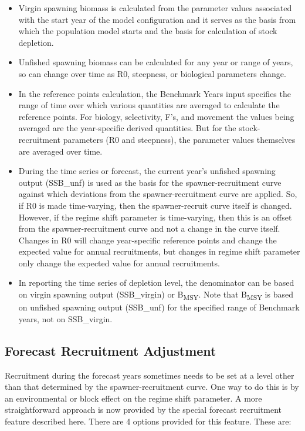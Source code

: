 \begin{itemize}
	\item Virgin spawning biomass is calculated from the parameter values associated with the start year of the model configuration and it serves as the basis from which the population model starts and the basis for calculation of stock depletion.
	
	\item Unfished spawning biomass can be calculated for any year or range of years, so can change over time as R0, steepness, or biological parameters change.
	
	\item In the reference points calculation, the Benchmark Years input specifies the range of time over which various quantities are averaged to calculate the reference points. For biology, selectivity, F's, and movement the values being averaged are the year-specific derived quantities. But for the stock-recruitment parameters (R0 and steepness), the parameter values themselves are averaged over time.
	
	\item During the time series or forecast, the current year's unfished spawning output (SSB\_unf) is used as the basis for the spawner-recruitment curve against which deviations from the spawner-recruitment curve are applied. So, if R0 is made time-varying, then the spawner-recruit curve itself is changed. However, if the regime shift parameter is time-varying, then this is an offset from the spawner-recruitment curve and not a change in the curve itself. Changes in R0 will change year-specific reference points and change the expected value for annual recruitments, but changes in regime shift parameter only change the expected value for annual recruitments.
	
	\item In reporting the time series of depletion level, the denominator can be based on virgin spawning output (SSB\_virgin) or B\textsubscript{MSY}. Note that B\textsubscript{MSY} is based on unfished spawning output (SSB\_unf) for the specified range of Benchmark years, not on SSB\_virgin.
\end{itemize}


\hypertarget{ForeSpawn}{}
\subsection{Forecast Recruitment Adjustment}
Recruitment during the forecast years sometimes needs to be set at a level other than that determined by the spawner-recruitment curve. One way to do this is by an environmental or block effect on the regime shift parameter. A more straightforward approach is now provided by the special forecast recruitment feature described here. There are 4 options provided for this feature. These are:

